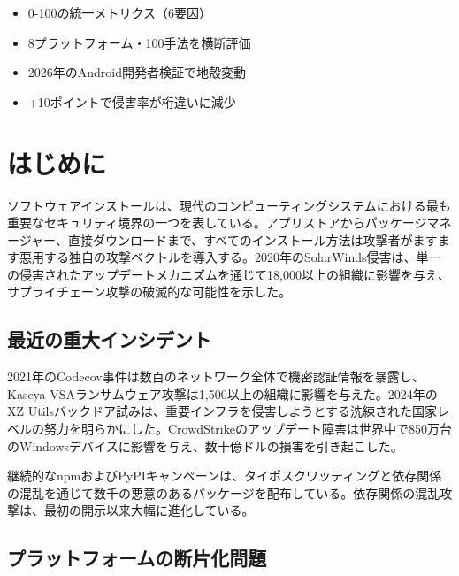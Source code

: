 \documentclass[Specialissue]{jsaiart}
\author{%
 \name{ブルンナー}{グンタ}{Günther Brunner}
 \affiliation{\hspace{4em}株式会社サイバーエージェント AIドリブン推進室}%
     {\hspace{7em}Software Engineer}%
     {\hspace{5em}gunther\_brunner@cyberagent.co.jp}
}
\begin{document}
\maketitle

\begin{callout}[要点]
\begin{itemize}
  \item 0-100の統一メトリクス（6要因）
  \item 8プラットフォーム・100手法を横断評価
  \item 2026年のAndroid開発者検証で地殻変動
  \item +10ポイントで侵害率が桁違いに減少
\end{itemize}
\end{callout}

\section{はじめに}

ソフトウェアインストールは、現代のコンピューティングシステムにおける最も重要なセキュリティ境界の一つを表している。アプリストアからパッケージマネージャー、直接ダウンロードまで、すべてのインストール方法は攻撃者がますます悪用する独自の攻撃ベクトルを導入する。2020年のSolarWinds侵害は、単一の侵害されたアップデートメカニズムを通じて18,000以上の組織に影響を与え、サプライチェーン攻撃の破滅的な可能性を示した\cite{fireeye2020sunburst,solarwinds2024sec}。

\subsection{最近の重大インシデント}

2021年のCodecov事件は数百のネットワーク全体で機密認証情報を暴露し\cite{codecov2021incident}、Kaseya VSAランサムウェア攻撃は1,500以上の組織に影響を与えた\cite{kaseya2021ransomware}。2024年のXZ Utilsバックドア試みは、重要インフラを侵害しようとする洗練された国家レベルの努力を明らかにした\cite{xz2024backdoor}。CrowdStrikeのアップデート障害は世界中で850万台のWindowsデバイスに影響を与え、数十億ドルの損害を引き起こした\cite{crowdstrike2024outage}。

継続的なnpmおよびPyPIキャンペーンは、タイポスクワッティングと依存関係の混乱を通じて数千の悪意のあるパッケージを配布している\cite{ladisa2023taxonomy,zimmermann2019npm,pypi2023malware,npm2022colors}。依存関係の混乱攻撃は、最初の開示以来大幅に進化している\cite{dependency2024confusion}。

\subsection{プラットフォームの断片化問題}
\end{document}
